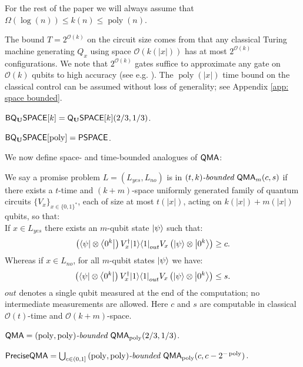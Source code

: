 \documentclass[a4paper,UKenglish]{lipics-v2016}
\newcommand\QMA{{\sf{QMA}}}
\newcommand\PSPACE{{\sf{PSPACE}}}
\newcommand\preciseQMA{{\sf{PreciseQMA}}}
\newcommand\bddQMA[5]{{\left(#1,#2\right)}\textit{-bounded }\QMA_{#3}(#4,#5)}
\newcommand{\classfont}{\sf}
\newcommand{\Unitary}{\mathbf{U}}
\newcommand{\unitaryQSPACE}[3]{{\classfont{Q}_\Unitary\classfont{SPACE}}[#1](#2,#3)}
\newcommand{\unitaryBQSPACE}[1]{{\classfont{BQ}_\Unitary\classfont{SPACE}}[#1]}
\newcommand\bigoh{\mathcal{O}}
\DeclareMathOperator{\poly}{poly}
\begin{document}
For the rest of the paper we will always assume that $\Omega(\log(n)) \le k(n) \le \poly(n)$.

The bound $T=2^{\mathcal{O}(k)}$ on the circuit size comes from that any classical Turing machine generating $Q_x$ using space $\bigoh(k(|x|))$ has at most $2^{\mathcal{O}(k)}$ configurations. We note that $2^{\mathcal{O}(k)}$ gates suffice to approximate any gate on $\bigoh(k)$ qubits to high accuracy (see e.g. \cite[Chapter~4]{nc00}). The $\poly(|x|)$ time bound on the classical control can be assumed without loss of generality; see Appendix \ref{app: space bounded}.

\begin{definition} $\unitaryBQSPACE{k}=\unitaryQSPACE{k}{2/3}{1/3}$.\end{definition}
\begin{theorem}\label{thm:pqpspace} $\unitaryBQSPACE{\poly}=\PSPACE$.
\end{theorem}

We now define space- and time-bounded analogues of $\QMA$:
\begin{definition}We say a promise problem $L=(L_{yes},L_{no})$ is in $\bddQMA{t}{k}{m}{c}{s}$ if there exists a $t$-time and $(k+m)$-space uniformly generated family of quantum circuits $\{ V_x\}_{x\in\{0,1\}^*}$, each of size at most $t(|x|)$, acting on $k(|x|)+m(|x|)$ qubits, so that:\\

If $x \in L_{yes}$ there exists an $m$-qubit state ${\left\vert{\psi}\right\rangle}$ such that:
\begin{equation}
\left({\left\langle{\psi}\right\vert}\otimes {\left\langle{0^k}\right\vert}\right) V^\dagger_x {\left\vert{1}\right\rangle}{\left\langle{1}\right\vert}_{out} V_x \left({\left\vert{\psi}\right\rangle}\otimes {\left\vert{0^k}\right\rangle}\right) \ge c.
\end{equation}
Whereas if $x \in L_{no}$, for all $m$-qubit states ${\left\vert{\psi}\right\rangle}$ we have:
\begin{equation}
\left({\left\langle{\psi}\right\vert}\otimes {\left\langle{0^k}\right\vert}\right) V^\dagger_x {\left\vert{1}\right\rangle}{\left\langle{1}\right\vert}_{out} V_x \left({\left\vert{\psi}\right\rangle}\otimes {\left\vert{0^k}\right\rangle}\right) \le s.
\end{equation}
$out$ denotes a single qubit measured at the end of the computation; no intermediate measurements are allowed.  
Here $c$ and $s$ are computable in classical $\bigoh(t)$-time and $\bigoh(k+m)$-space.
  \end{definition}

\begin{definition} $\QMA=\bddQMA{\poly}{\poly}{\poly}{2/3}{1/3}$.
\end{definition}
\begin{definition} $\preciseQMA=\bigcup_{c \in (0,1]}\bddQMA{\poly}{\poly}{\poly}{c}{c-2^{-\poly}}$.
\end{definition}
\end{document}
